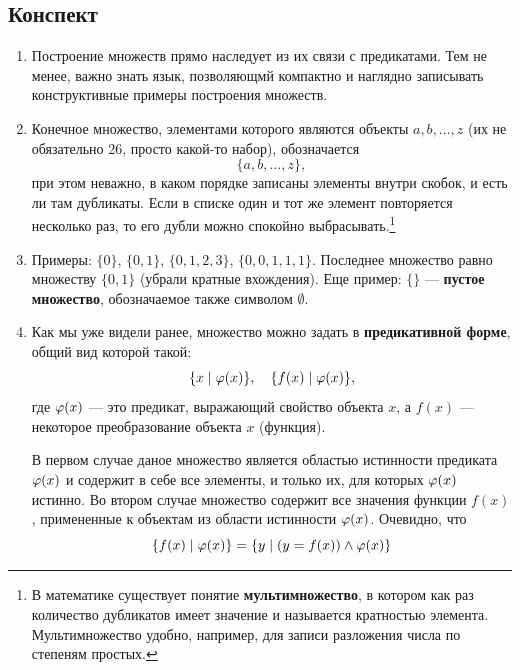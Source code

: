 \subsection{Конспект}
\begin{enumerate}
\item Построение множеств прямо наследует из их связи с предикатами. Тем не менее, важно знать язык, позволяющмй компактно и наглядно записывать конструктивные примеры построения множеств.
\item Конечное множество, элементами которого являются объекты $a,b,\dots,z$ (их не обязательно 26, просто какой-то набор), обозначается
$$
\{a,b,\dots,z\},
$$
при этом неважно, в каком порядке записаны элементы внутри скобок, и есть ли там дубликаты. Если в списке один и тот же элемент повторяется несколько раз, то его дубли можно спокойно выбрасывать.\footnote{В математике существует понятие \textbf{мультимножество}, в котором как раз количество дубликатов имеет значение и называется кратностью элемента. Мультимножество удобно, например, для записи разложения числа по степеням простых.}
\item Примеры: $\{0\}$, $\{0,1\}$, $\{0,1,2,3\}$, $\{0,0,1,1,1\}$. Последнее множество равно множеству $\{0,1\}$ (убрали кратные вхождения). Еще пример: $\{\}$ --- \textbf{пустое множество}, обозначаемое также символом $\emptyset$.
\item Как мы уже видели ранее, множество можно задать в \textbf{предикативной форме}, общий вид которой такой:
$$
\{x\mid \varphi(x)\},\quad \{f(x)\mid \varphi(x)\},
$$
где $\varphi(x)$ --- это предикат, выражающий свойство объекта $x$, а $f(x)$ --- некоторое преобразование объекта $x$ (функция). 

В первом случае даное множество является областью истинности предиката $\varphi(x)$ и содержит в себе все элементы, и только их, для которых $\varphi(x)$ истинно. Во втором случае множество содержит все значения функции $f(x)$, примененные к объектам из области истинности $\varphi(x)$. Очевидно, что
$$
\{f(x)\mid \varphi(x)\} = \{y\mid(y=f(x))\land\varphi(x)\}
$$


\end{enumerate}
